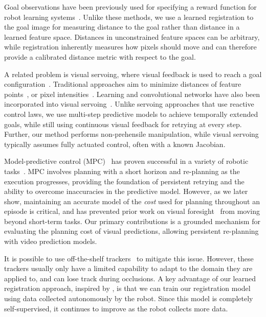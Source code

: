 Goal observations have been previously used for specifying a reward function for robot learning systems~\cite{jagersand1995visual,deguchi1999image,e2c,dsae}. Unlike these methods, we use a learned registration to the goal image for measuring distance to the goal rather than distance in a learned feature space. Distances in unconstrained feature spaces can be arbitrary, while registration inherently measures how pixels should move and can therefore provide a calibrated distance metric with respect to the goal. 

A related problem is visual servoing, where visual feedback is used to reach a goal configuration~\cite{hutchinson1996tutorial,kragic2002survey,desouza2002survey}.
Traditional approaches aim to minimize distances of feature points~\cite{feddema1989vision,espiau1992servo,wilson1996relative}, or pixel intensities~\cite{caron2013photometric}. Learning and convolutional networks have also been incorporated into visual servoing~\cite{saxena2017servoing,bateux2018servoing,lee2017servoing,google_handeye}. Unlike servoing approaches that use reactive control laws, we use multi-step predictive models to achieve temporally extended goals, while still using continuous visual feedback for retrying at every step. Further, our method performs non-prehensile manipulation, while visual servoing typically assumes fully actuated control, often with a known Jacobian.

Model-predictive control (MPC)~\cite{camacho2013model} has proven successful in a variety of robotic tasks~\cite{shim2003decentralized,allibert2010predictive,howard2010receding,williams2017information,deep_mpc}.
MPC involves planning with a short horizon and re-planning as the execution progresses, providing the foundation of persistent retrying and the ability to overcome inaccuracies in the predictive model. However, as we later show, maintaining an accurate model of the \emph{cost} used for planning throughout an episode is critical, and has prevented prior work on visual foresight~\cite{foresight,sna} from moving beyond short-term tasks.
Our primary contributions is a grounded mechanism for evaluating the planning cost of visual predictions, allowing persistent re-planning with video prediction models.

It is possible to use off-the-shelf trackers~\cite{lucas1981iterative,brox2004high,babenko2009visual,mei2009robust} to mitigate this issue. However, these trackers usually only have a limited capability to adapt to the domain they are applied to, and can lose track during occlusions. A key advantage of our learned registration approach, inspired by \cite{meister2017unflow}, is that we can train our registration model using data collected autonomously by the robot. Since this model is completely self-supervised, it continues to improve as the robot collects more data.
